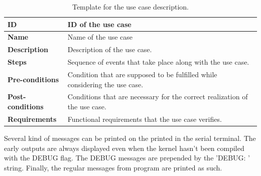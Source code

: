 \begin{table}[H]
    \centering
    \begin{tabular}{| p{3cm} | p{7cm} |}
    \hline
    \textbf{ID}             & ID of the use case \\ \hline
    \textbf{Name}           & Name of the use case \\ \hline
    \textbf{Description}    & Description of the use case. \\ \hline
    \textbf{Steps}          & Sequence of events that take place along with the use case. \\ \hline
    \textbf{Pre-conditions} & Condition that are supposed to be fulfilled while considering the use case. \\ \hline
    \textbf{Post-conditions} & Conditions that are necessary for the correct realization of the use case. \\ \hline
    \textbf{Requirements}       & Functional requirements that the use case verifies. \\ \hline
    \end{tabular}
    \caption{Template for the use case description.}
\end{table}


Several kind of messages can be printed on the printed in the serial terminal. The early outputs are always displayed even when the kernel hasn't been compiled with the DEBUG flag. The DEBUG messages are prepended by the 'DEBUG: ' string. Finally, the regular messages from program are printed as such.


